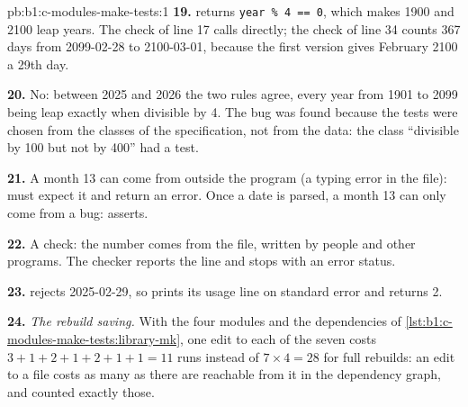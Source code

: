 \begin{solution}{pb:b1:c-modules-make-tests:1}
\textbf{19.}  returns \texttt{year \% 4 == 0}, which makes 1900 and 2100 leap years. The check of line 17
calls  directly; the check of line 34 counts 367 days from 2099-02-28 to 2100-03-01, because the
first version gives February 2100 a 29th day.

\textbf{20.} No: between 2025 and 2026 the two rules agree, every year from 1901 to 2099 being leap exactly when
divisible by 4. The bug was found because the tests were chosen from the classes of the specification, not from the
data: the class ``divisible by 100 but not by 400'' had a test.

\textbf{21.} A month 13 can come from outside the program (a typing error in the file):  must expect
it and return an error. Once a date is parsed, a month 13 can only come from a bug:  asserts.

\textbf{22.} A check: the number comes from the file, written by people and other programs. The checker reports the line
and stops with an error status.

\textbf{23.}  rejects 2025-02-29, so  prints its usage line on standard error and returns 2.

\textbf{24.} \emph{The rebuild saving.} With the four modules and the dependencies of
\cref{lst:b1:c-modules-make-tests:library-mk}, one edit to each of the seven  costs $3 + 1 + 2 + 1 + 2 + 1 +
1 = 11$  runs instead of $7 \times 4 = 28$ for full rebuilds: an edit to a file costs as many  as
there are  reachable from it in the dependency graph, and  counted exactly those.
\end{solution}
